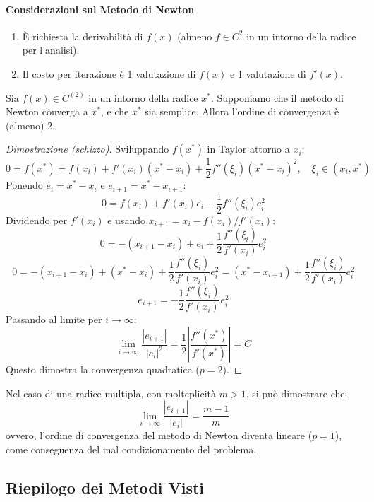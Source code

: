 \paragraph{Considerazioni sul Metodo di Newton}
\begin{enumerate}
    \item È richiesta la derivabilità di $f(x)$ (almeno $f \in C^2$ in un intorno della radice per l'analisi).
    \item Il costo per iterazione è 1 valutazione di $f(x)$ e 1 valutazione di $f'(x)$.
\end{enumerate}

\begin{teorema}
    Sia $f(x) \in C^{(2)}$ in un intorno della radice $x^*$. Supponiamo che il metodo di Newton converga a $x^*$, e che $x^*$ sia semplice. Allora l'ordine di convergenza è (almeno) 2.
\end{teorema}
\begin{proof}[Dimostrazione (schizzo)]
Sviluppando $f(x^*)$ in Taylor attorno a $x_i$:
$$ 0 = f(x^*) = f(x_i) + f'(x_i)(x^* - x_i) + \frac{1}{2} f''(\xi_i)(x^* - x_i)^2, \quad \xi_i \in (x_i, x^*) $$
Ponendo $e_i = x^* - x_i$ e $e_{i+1} = x^* - x_{i+1}$:
$$ 0 = f(x_i) + f'(x_i)e_i + \frac{1}{2} f''(\xi_i)e_i^2 $$
Dividendo per $f'(x_i)$ e usando $x_{i+1} = x_i - f(x_i)/f'(x_i)$:
$$ 0 = -(x_{i+1} - x_i) + e_i + \frac{1}{2} \frac{f''(\xi_i)}{f'(x_i)} e_i^2 $$
$$ 0 = -(x_{i+1} - x_i) + (x^* - x_i) + \frac{1}{2} \frac{f''(\xi_i)}{f'(x_i)} e_i^2 = (x^* - x_{i+1}) + \frac{1}{2} \frac{f''(\xi_i)}{f'(x_i)} e_i^2 $$
$$ e_{i+1} = - \frac{1}{2} \frac{f''(\xi_i)}{f'(x_i)} e_i^2 $$
Passando al limite per $i \to \infty$:
$$ \lim_{i \to \infty} \frac{|e_{i+1}|}{|e_i|^2} =  \frac{1}{2} \left|\frac{f''(x^*)}{f'(x^*)} \right| = C $$
Questo dimostra la convergenza quadratica ($p=2$).
\end{proof}

\begin{osservazione}
    Nel caso di una radice multipla, con molteplicità $m > 1$, si può dimostrare che:
    $$ \lim_{i \to \infty} \frac{|e_{i+1}|}{|e_i|} = \frac{m-1}{m} $$
    ovvero, l'ordine di convergenza del metodo di Newton diventa lineare ($p=1$), come conseguenza del mal condizionamento del problema.
\end{osservazione}

\subsection*{Riepilogo dei Metodi Visti}

